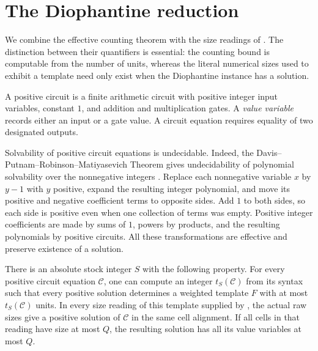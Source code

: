 \section{The Diophantine reduction}
\label{sec:diophantine}

We combine the effective counting theorem with the size readings of
.  The distinction between their quantifiers is
essential: the counting bound is computable from the number of units,
whereas the literal numerical sizes used to exhibit a template need
only exist when the Diophantine instance has a solution.

\begin{definition}\label{n:positive-circuits}
A positive circuit is a finite arithmetic circuit with positive integer
input variables, constant $1$, and addition and multiplication gates.
A \emph{value variable} records either an input or a gate value.
A circuit equation requires equality of two designated outputs.
\end{definition}

Solvability of positive circuit equations is undecidable.  Indeed,
the Davis--Putnam--Robinson--Matiyasevich Theorem gives undecidability
of polynomial solvability over the nonnegative integers
\citep{Matiyasevich1970,Matiyasevich1971}.  Replace each nonnegative variable $x$ by
$y-1$ with $y$ positive, expand the resulting integer polynomial,
and move its positive and negative coefficient terms to opposite
sides.  Add $1$ to both sides, so each side is positive even when
one collection of terms was empty.  Positive integer coefficients
are made by sums of $1$, powers by products, and the resulting
polynomials by positive circuits.  All these transformations are
effective and preserve existence of a solution.

\begin{lemma}
\label{n:circuit-template}
There is an absolute stock integer $S$ with the following property.
For every positive circuit equation $\mathcal C$, one can compute
an integer $t_S(\mathcal C)$ from its syntax such that every positive
solution determines a weighted template $F$ with at most
$t_S(\mathcal C)$ units.  In every size reading of this template
supplied by , the actual raw sizes
give a positive solution of $\mathcal C$ in the same cell alignment.
If all cells in that reading have size at most $Q$, the resulting
solution has all its value variables at most $Q$.
\end{lemma}

